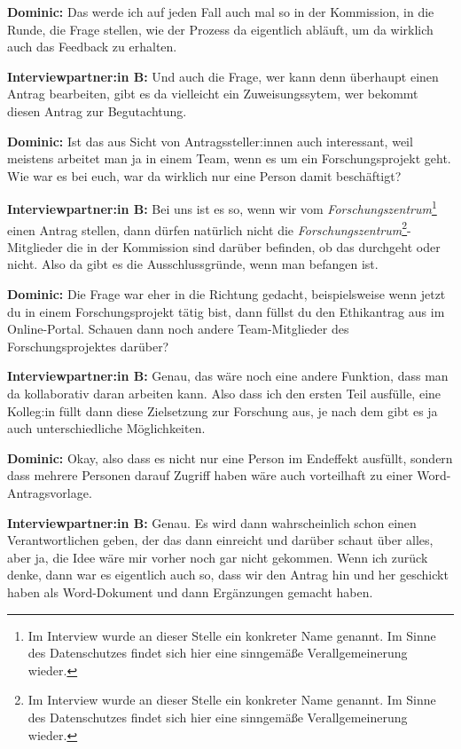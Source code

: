 \documentclass[a4paper,12pt,twoside]{scrreprt}
\begin{document}
\textbf{Dominic:} Das werde ich auf jeden Fall auch mal so in der Kommission, in die Runde, die Frage stellen, wie der Prozess da eigentlich abläuft, um da wirklich auch das Feedback zu erhalten.

\textbf{Interviewpartner:in B:} Und auch die Frage, wer kann denn überhaupt einen Antrag bearbeiten, gibt es da vielleicht ein Zuweisungssytem, wer bekommt diesen Antrag zur Begutachtung.

\textbf{Dominic:} Ist das aus Sicht von Antragssteller:innen auch interessant, weil meistens arbeitet man ja in einem Team, wenn es um ein Forschungsprojekt geht. Wie war es bei euch, war da wirklich nur eine Person damit beschäftigt?

\textbf{Interviewpartner:in B:} Bei uns ist es so, wenn wir vom \textit{Forschungszentrum}\footnote{Im Interview wurde an dieser Stelle ein konkreter Name genannt. Im Sinne des Datenschutzes findet sich hier eine sinngemäße Verallgemeinerung wieder.} einen Antrag stellen, dann dürfen natürlich nicht die \textit{Forschungszentrum}\footnote{Im Interview wurde an dieser Stelle ein konkreter Name genannt. Im Sinne des Datenschutzes findet sich hier eine sinngemäße Verallgemeinerung wieder.}-Mitglieder die in der Kommission sind darüber befinden, ob das durchgeht oder nicht. Also da gibt es die Ausschlussgründe, wenn man befangen ist.

\textbf{Dominic:} Die Frage war eher in die Richtung gedacht, beispielsweise wenn jetzt du in einem Forschungsprojekt tätig bist, dann füllst du den Ethikantrag aus im Online-Portal. Schauen dann noch andere Team-Mitglieder des Forschungsprojektes darüber?

\textbf{Interviewpartner:in B:} Genau, das wäre noch eine andere Funktion, dass man da kollaborativ daran arbeiten kann. Also dass ich den ersten Teil ausfülle, eine Kolleg:in füllt dann diese Zielsetzung zur Forschung aus, je nach dem gibt es ja auch unterschiedliche Möglichkeiten.

\textbf{Dominic:} Okay, also dass es nicht nur eine Person im Endeffekt ausfüllt, sondern dass mehrere Personen darauf Zugriff haben wäre auch vorteilhaft zu einer Word-Antragsvorlage.

\textbf{Interviewpartner:in B:} Genau. Es wird dann wahrscheinlich schon einen Verantwortlichen geben, der das dann einreicht und darüber schaut über alles, aber ja, die Idee wäre mir vorher noch gar nicht gekommen. Wenn ich zurück denke, dann war es eigentlich auch so, dass wir den Antrag hin und her geschickt haben als Word-Dokument und dann Ergänzungen gemacht haben.
\end{document}
